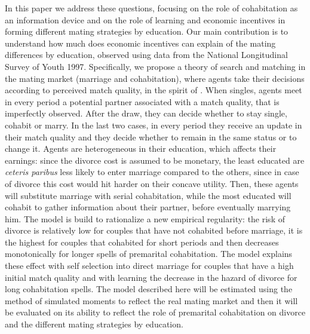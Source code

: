 \documentclass[12pt]{article}
\begin{document}
In this paper we address these questions, focusing on the role of cohabitation as an information device and on the role of learning and economic incentives in forming different mating strategies by education. Our main contribution is to understand how much does economic incentives can explain of the mating differences by education, observed using data from the National Longitudinal Survey of Youth 1997. Specifically, we propose a theory of search and matching in the mating market (marriage and cohabitation), where agents take their decisions according to perceived match quality, in the spirit of \citet{jovanovic1979}. When singles, agents meet in every period a potential partner associated with a match quality, that is imperfectly observed. After the draw, they can decide whether to stay single, cohabit or marry. In the last two cases, in every period they receive an update in their match quality and they decide whether to remain in the same status or to change it. Agents are heterogeneous in their education, which affects their earnings: since the divorce cost is assumed to be monetary, the least educated are \textit{ceteris paribus} less likely to enter marriage compared to the others, since in case of divorce this cost would hit harder on their concave utility. Then, these agents will substitute marriage with serial cohabitation, while the most educated will cohabit to gather information about their partner, before eventually marrying him. The model is build to rationalize a new empirical regularity: the risk of divorce is relatively low for couples that have not cohabited before marriage, it is the highest for couples that cohabited for short periods and then decreases monotonically for longer spells of premarital cohabitation. The model explains these effect with self selection into direct marriage for couples that have a high initial match quality and with learning the decrease in the hazard of divorce for long cohabitation spells. The model described here will be estimated using the method of simulated moments to reflect the real mating market and then it will be evaluated on its ability to reflect the role of premarital cohabitation on divorce and the different mating strategies by education.
\end{document}
